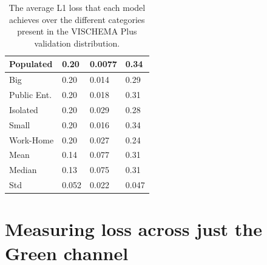 \documentclass{UoYCSproject}
\begin{document}
\begin{table}[ht]
\begin{tabular}{|l|lll|}
        Populated              & \multicolumn{1}{l|}{0.20}        & \multicolumn{1}{l|}{0.0077}& 0.34                                   \\ \hline
        Big                    & \multicolumn{1}{l|}{0.20}        & \multicolumn{1}{l|}{0.014}& 0.29                                    \\ \hline
        Public Ent.            & \multicolumn{1}{l|}{0.20}        & \multicolumn{1}{l|}{0.018}& 0.31                                    \\ \hline
        Isolated               & \multicolumn{1}{l|}{0.20}        & \multicolumn{1}{l|}{0.029}& 0.28                                    \\ \hline
        Small                  & \multicolumn{1}{l|}{0.20}        & \multicolumn{1}{l|}{0.016}& 0.34                                    \\ \hline
        Work-Home              & \multicolumn{1}{l|}{0.20}        & \multicolumn{1}{l|}{0.027}& 0.24                                    \\ \hline
        \hline
        Mean                   & \multicolumn{1}{l|}{0.14}        & \multicolumn{1}{l|}{0.077}& 0.31                                    \\ \hline
        Median                 & \multicolumn{1}{l|}{0.13}        & \multicolumn{1}{l|}{0.075}& 0.31                                    \\ \hline
        Std                    & \multicolumn{1}{l|}{0.052}       & \multicolumn{1}{l|}{0.022}& 0.047                                   \\ \hline
    \end{tabular}
    \label{tab:categories}
    \caption{The average L1 loss that each model achieves over the different categories present in the VISCHEMA Plus validation distribution.}
\end{table}

\section{Measuring loss across just the Green channel}
\end{document}
